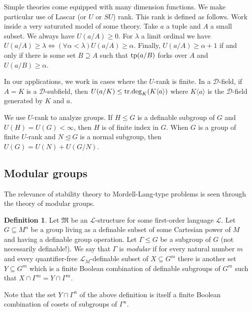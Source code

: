 \documentclass{amsart}
\newcommand{\cD}{{\mathcal D}}
\newcommand{\cL}{{\mathcal L}}
\newcommand{\fM}{{\mathfrak M}}
\newcommand{\tp}{{\rm tp}}
\theoremstyle{definition}
\newtheorem{Def}[thm]{Definition}
\theoremstyle{remark}
\begin{document}
Simple theories come equipped with many dimension functions.  We make particular use of 
Lascar (or $U$ or $SU$) rank.  This rank is defined as follows. 
Work inside a very saturated model of some theory.  
Take $a$ a tuple and $A$ a small subset.  We always have 
$U(a/A) \geq 0$.  For $\lambda$ a limit ordinal we have $U(a/A) \geq \lambda 
\Leftrightarrow (\forall \alpha < \lambda) U(a/A) \geq \alpha$.  Finally, 
$U(a/A) \geq \alpha + 1$ if and only if there is some set $B \supseteq A$ such that 
$\tp(a/B)$ forks over $A$ and $U(a/B) \geq \alpha$.    

In our applications, we work in cases where the $U$-rank is finite.  In a $\cD$-field,
if $A = K$ is a $\cD$-subfield, then $U(a/K) \leq {\rm tr.deg}_K(K \langle a \rangle)$
where $K \langle a \rangle$ is the $\cD$-field generated by $K$ and $a$.  

We use $U$-rank to analyze groups.  If $H \leq G$ is a definable subgroup of $G$ and 
$U(H) = U(G) < \infty$, then $H$ is of finite index in $G$.  
When $G$ is a group of finite $U$-rank and $N \trianglelefteq G$ is a normal subgroup, then 
$U(G) = U(N) + U(G/N)$. 






\subsection{Modular groups}

The relevance of stability theory to Mordell-Lang-type problems is seen through the
theory of modular groups.


\begin{Def}
Let $\fM$ be an $\cL$-structure for some  first-order language $\cL$.
Let $G \subseteq M^n$ be a group living as a definable subset of some 
Cartesian power of $M$ and having a definable group operation.  Let $\Gamma \leq G$ 
be a subgroup of $G$ (not necessarily definable!).  We say
that $\Gamma$ is \emph{modular} if for every natural number $m$ and every 
quantifier-free $\cL_M$-definable subset of $X \subseteq G^m$ 
there is another set $Y \subseteq G^m$ which is a finite Boolean combination of 
definable subgroups of $G^m$ such that $X \cap \Gamma^m = Y \cap \Gamma^m$. 
\end{Def}

Note that the set $Y \cap \Gamma^n$ of the above definition is itself a finite
Boolean combination of cosets of subgroups of $\Gamma^n$.
\end{document}
